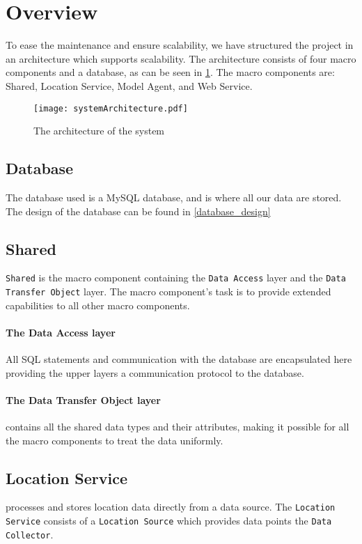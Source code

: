 \section{Overview}
To ease the maintenance and ensure scalability, we have structured the project in an architecture which supports scalability.
The architecture consists of four macro components and a database, as can be seen in \cref{fig:architecture}. The macro components are: Shared, Location Service, Model Agent, and Web Service.

\begin{figure}[H]
\texttt{[image: systemArchitecture.pdf]}
\caption{The architecture of the system}
\label{fig:architecture}
\end{figure}

\subsection{Database} The database used is a MySQL database, and is where all our data are stored.
The design of the database can be found in \cref{database_design}


\subsection{Shared}\texttt{Shared} is the macro component containing the \texttt{Data Access} layer and the \texttt{Data Transfer Object} layer.
The macro component's task is to provide extended capabilities to all other macro components.

\paragraph{The Data Access layer} All SQL statements and communication with the database are encapsulated here providing the upper layers a communication protocol to the database.

\paragraph{The Data Transfer Object layer} contains all the shared data types and their attributes, making it possible for all the macro components to treat the data uniformly.


\subsection{Location Service} processes and stores location data directly from a data source. 
The \texttt{Location Service} consists of a \texttt{Location Source} which provides data points the \texttt{Data Collector}.

